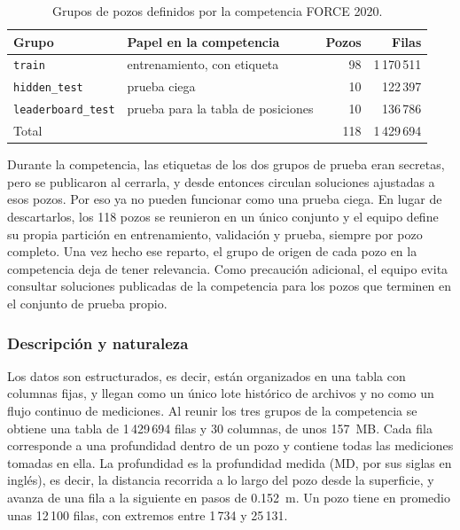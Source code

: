 \documentclass[11pt,a4paper]{article}
\begin{document}
\begin{table}[htbp]
\centering
\caption{Grupos de pozos definidos por la competencia FORCE 2020.}
\label{tab:grupos}
\begin{tabular}{llrr}
\toprule
\textbf{Grupo} & \textbf{Papel en la competencia} & \textbf{Pozos} & \textbf{Filas} \\
\midrule
\texttt{train} & entrenamiento, con etiqueta & 98 & 1\,170\,511 \\
\texttt{hidden\_test} & prueba ciega & 10 & 122\,397 \\
\texttt{leaderboard\_test} & prueba para la tabla de posiciones & 10 & 136\,786 \\
\midrule
Total & & 118 & 1\,429\,694 \\
\bottomrule
\end{tabular}
\end{table}

Durante la competencia, las etiquetas de los dos grupos de prueba eran secretas, pero se publicaron al cerrarla, y desde entonces circulan soluciones ajustadas a esos pozos. Por eso ya no pueden funcionar como una prueba ciega. En lugar de descartarlos, los 118 pozos se reunieron en un único conjunto y el equipo define su propia partición en entrenamiento, validación y prueba, siempre por pozo completo. Una vez hecho ese reparto, el grupo de origen de cada pozo en la competencia deja de tener relevancia. Como precaución adicional, el equipo evita consultar soluciones publicadas de la competencia para los pozos que terminen en el conjunto de prueba propio.

\subsubsection{Descripción y naturaleza}

Los datos son estructurados, es decir, están organizados en una tabla con columnas fijas, y llegan como un único lote histórico de archivos y no como un flujo continuo de mediciones. Al reunir los tres grupos de la competencia se obtiene una tabla de 1\,429\,694 filas y 30 columnas, de unos 157~MB. Cada fila corresponde a una profundidad dentro de un pozo y contiene todas las mediciones tomadas en ella. La profundidad es la profundidad medida (MD, por sus siglas en inglés), es decir, la distancia recorrida a lo largo del pozo desde la superficie, y avanza de una fila a la siguiente en pasos de 0.152~m. Un pozo tiene en promedio unas 12\,100 filas, con extremos entre 1\,734 y 25\,131.
\end{document}
